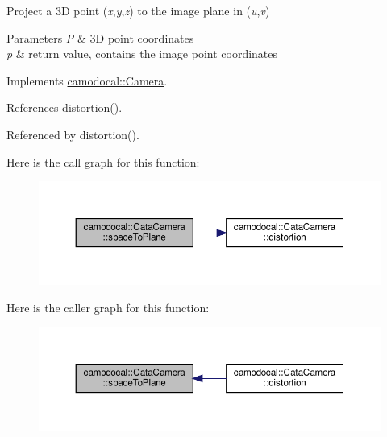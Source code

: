 Project a 3D point ({\itshape x},{\itshape y},{\itshape z}) to the image plane in ({\itshape u},{\itshape v}) 


\begin{DoxyParams}{Parameters}
{\em P} & 3D point coordinates \\
\hline
{\em p} & return value, contains the image point coordinates \\
\hline
\end{DoxyParams}


Implements \hyperlink{classcamodocal_1_1Camera_acf49bd1ef0919e0faf89d060dc497b52}{camodocal\+::\+Camera}.



References distortion().



Referenced by distortion().

Here is the call graph for this function\+:\nopagebreak
\begin{figure}[H]
\begin{center}
\leavevmode
\includegraphics[width=350pt]{classcamodocal_1_1CataCamera_ab705d867d93d87c85d755bb7b1022a2c_cgraph}
\end{center}
\end{figure}
Here is the caller graph for this function\+:\nopagebreak
\begin{figure}[H]
\begin{center}
\leavevmode
\includegraphics[width=350pt]{classcamodocal_1_1CataCamera_ab705d867d93d87c85d755bb7b1022a2c_icgraph}
\end{center}
\end{figure}
\mbox{\label{classcamodocal_1_1CataCamera_a9184557401622acaf2a00fd9b1295d13}} 
